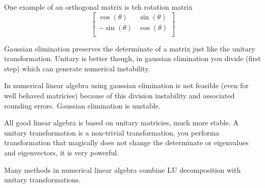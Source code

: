 \documentclass{article}
\newcommand{\be}{\begin{equation}}
\newcommand{\ee}{\end{equation}}
\begin{document}
One example of an orthogonal matrix is teh rotation matrix
\be
\begin{bmatrix}
    \cos(\theta)  & \sin(\theta) \\
    -\sin(\theta)  & \cos(\theta) \\
\end{bmatrix}
\ee



Gaussian elimination preserves the determinate of a matrix just like the unitary transformation. 
Unitary is better though, in gaussian elimination you divide (first step) which can generate numerical instability. 

In numerical linear algebra using gaussian elimination is not feasible (even for well behaved matricies) because of this division instability and associated rounding errors. 
Gaussian elimination is unstable. 

All good linear algebra is based on unitary matricies, much more stable. 
A unitary transformation is a non-trivial transformation, you performa  transformation that magically does not change the determinate or eigenvalues and eigenvectors, it is very powerful. 

Many methods in numerical linear algebra combine LU decomposition with unitary transformations. 
\end{document}
